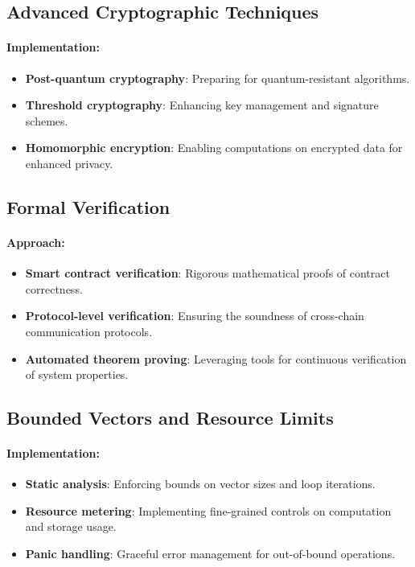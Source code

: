 \documentclass[12pt,a4paper]{article}
\begin{document}
\subsection{Advanced Cryptographic Techniques}
\paragraph{Implementation:}
\begin{itemize}
	\item \textbf{Post-quantum cryptography}: Preparing for quantum-resistant algorithms.
	\item \textbf{Threshold cryptography}: Enhancing key management and signature schemes.
	\item \textbf{Homomorphic encryption}: Enabling computations on encrypted data for enhanced privacy.
\end{itemize}

\subsection{Formal Verification}
\paragraph{Approach:}
\begin{itemize}
	\item \textbf{Smart contract verification}: Rigorous mathematical proofs of contract correctness.
	\item \textbf{Protocol-level verification}: Ensuring the soundness of cross-chain communication protocols.
	\item \textbf{Automated theorem proving}: Leveraging tools for continuous verification of system properties.
\end{itemize}

\subsection{Bounded Vectors and Resource Limits}
\paragraph{Implementation:}
\begin{itemize}
	\item \textbf{Static analysis}: Enforcing bounds on vector sizes and loop iterations.
	\item \textbf{Resource metering}: Implementing fine-grained controls on computation and storage usage.
	\item \textbf{Panic handling}: Graceful error management for out-of-bound operations.
\end{itemize}
\end{document}

